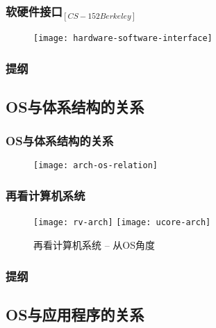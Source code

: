 
\begin{frame}[plain]
    
    \frametitle{{软硬件接口$ _{[CS-152 Berkeley]} $}}
    \begin{figure}
        \centering
        \texttt{[image: hardware-software-interface]}
    \end{figure}
    
    
\end{frame}


\begin{frame}
    \frametitle{提纲} 
    \tableofcontents 
\end{frame}


\subsection{OS与体系结构的关系}

\begin{frame}
    
    \frametitle{OS与体系结构的关系}
    
    \begin{figure}
        \centering
        \texttt{[image: arch-os-relation]}
    \end{figure}
    
\end{frame}

\begin{frame}
    
    \frametitle{再看计算机系统}
    
    \begin{figure}
        \centering
        \texttt{[image: rv-arch]}
        \texttt{[image: ucore-arch]}	
        \caption{再看计算机系统 -- 从OS角度}
    \end{figure}
    
    
\end{frame}


\begin{frame}
    \frametitle{提纲} 
    \tableofcontents 
\end{frame}


\subsection{OS与应用程序的关系} %

